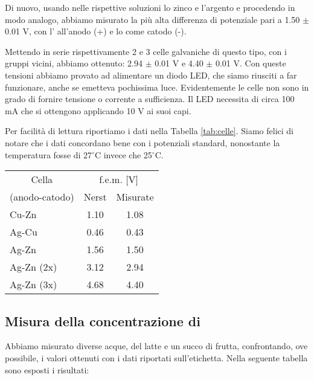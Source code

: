 Di nuovo, usando nelle rispettive soluzioni lo zinco e l'argento e procedendo in modo analogo,
abbiamo misurato la più alta differenza di potenziale pari a 1.50 $\pm$ 0.01 V,
con l' all'anodo (+) e lo  come catodo (-).

Mettendo in serie rispettivamente 2 e 3 celle galvaniche di questo tipo, con i gruppi vicini,
abbiamo ottenuto: 2.94 $\pm$ 0.01 V e 4.40 $\pm$ 0.01 V. Con queste tensioni abbiamo provato ad alimentare un
diodo LED, che siamo riusciti a far funzionare, anche se emetteva pochissima luce. Evidentemente
le celle non sono in grado di fornire tensione o corrente a sufficienza. Il LED necessita di circa 100 mA
che si ottengono applicando 10 V ai suoi capi.

Per facilità di lettura riportiamo i dati nella Tabella \ref{tab:celle}. Siamo felici di notare che i dati concordano bene
con i potenziali standard, nonostante la temperatura fosse di 27$^\circ$C invece che 25$^\circ$C. 

\begin{SCtable}[1][h]
    \centering
    \begin{tabular}{l c c}
        \toprule
        \multicolumn{1}{c}{Cella} & \multicolumn{2}{c}{f.e.m. [V]} \\
        (anodo-catodo) & Nerst & Misurate \\
        \midrule
        Cu-Zn & 1.10 & 1.08 \\
        Ag-Cu & 0.46 & 0.43 \\
        Ag-Zn & 1.56 & 1.50 \\
        Ag-Zn (2x) & 3.12 & 2.94 \\
        Ag-Zn (3x) & 4.68 & 4.40 \\
        \bottomrule
    \end{tabular}
    \caption{Forze elettromotrici misurate con il multimetro. Nella prima colonna abbiamo riportato le coppie di metalli
    secondo la convezione anodo-catodo. I (2x) e (3x) indicano il numero di celle in serie. Le incertezze sono di 0.01 V.}
    \label{tab:celle}
\end{SCtable}

\subsection*{Misura della concentrazione di }

Abbiamo misurato diverse acque, del latte e un succo di frutta, confrontando, ove possibile, i valori ottenuti con i dati riportati sull'etichetta. Nella seguente tabella sono esposti i risultati:

